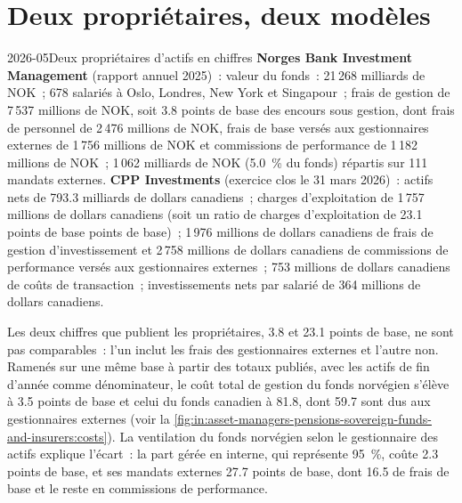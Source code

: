 \section{Deux propriétaires, deux modèles}

\begin{dated}{2026-05}{Deux propriétaires d'actifs en chiffres}\label{dat:in:asset-managers-pensions-sovereign-funds-and-insurers:owners}
\textbf{Norges Bank Investment Management} (rapport annuel 2025)~: valeur du fonds~: 21\,268 milliards de NOK~; 678 salariés à Oslo,
Londres, New York et Singapour~; frais de gestion de 7\,537 millions de NOK, soit 3.8 points de base des encours sous gestion, dont
frais de personnel de 2\,476 millions de NOK, frais de base versés aux gestionnaires externes de 1\,756 millions de NOK et commissions de performance de 1\,182
millions de NOK~; 1\,062 milliards de NOK (5.0~\% du fonds) répartis sur 111 mandats externes. \textbf{CPP Investments} (exercice clos le 31
mars 2026)~: actifs nets de 793.3 milliards de dollars canadiens~; charges d'exploitation de 1\,757 millions de dollars canadiens (soit un ratio de charges d'exploitation de 23.1 points de base
points de base)~; 1\,976 millions de dollars canadiens de frais de gestion d'investissement et 2\,758 millions de dollars canadiens de commissions de performance versés aux
gestionnaires externes~; 753 millions de dollars canadiens de coûts de transaction~; investissements nets par salarié de 364 millions de dollars canadiens.
\end{dated}

Les deux chiffres que publient les propriétaires, 3.8 et 23.1 points de base, ne sont pas comparables~: l'un inclut les frais des gestionnaires externes
et l'autre non. Ramenés sur une même base à partir des totaux publiés, avec les actifs de fin d'année comme dénominateur, le
coût total de gestion du fonds norvégien s'élève à 3.5 points de base et celui du fonds canadien à 81.8, dont 59.7 sont dus aux
gestionnaires externes (voir la \cref{fig:in:asset-managers-pensions-sovereign-funds-and-insurers:costs}). La ventilation du fonds norvégien
selon le gestionnaire des actifs explique l'écart~: la part gérée en interne, qui représente 95~\%, coûte 2.3 points de base, et ses mandats externes 27.7
points de base, dont 16.5 de frais de base et le reste en commissions de performance.

